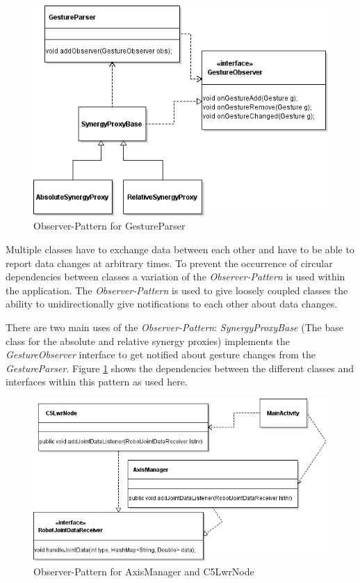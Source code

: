\begin{figure}
	\caption{\label{fig:conc:obs1}Observer-Pattern for GestureParser}
	\includegraphics[width=\linewidth]{assets/chpt_concepts/sw/gesture_observer.png}
\end{figure}

Multiple classes have to exchange data between each other and have to be able to report data changes at arbitrary times. To prevent the occurrence of circular dependencies between classes a variation of the \textit{Observer-Pattern} is used within the application. The \textit{Observer-Pattern} is used to give loosely coupled classes the ability to unidirectionally give notifications to each other about data changes\cite{Eilebrecht2013}.

There are two main uses of the \textit{Observer-Pattern}: 
\textit{SynergyProxyBase} (The base class for the absolute and relative synergy proxies) implements the \textit{GestureObserver} interface to get notified about gesture changes from the \textit{GestureParser}. Figure \ref{fig:conc:obs1} shows the dependencies between the different classes and interfaces within this pattern as used here.

\begin{figure}
	\caption{Observer-Pattern for AxisManager and C5LwrNode\label{fig:conc:obs2}}
	\includegraphics[width=\linewidth]{assets/chpt_concepts/sw/node_axismanager.png}
\end{figure}

